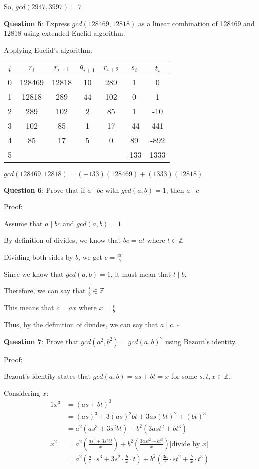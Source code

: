 \documentclass{article} %
\newcommand{\question}[2][]{\begin{flushleft}
        \textbf{Question #1}: #2

\end{flushleft}}
\begin{document}
    So, $gcd(2947, 3997) = 7$

    \question[5]{Express $gcd(128469, 12818)$ as a linear combination of 128469 and 12818 using 
    extended Euclid algorithm.}

    Applying Euclid's algorithm:
    \begin{tabular}{|c|c|c|c|c|c|c|}
        \hline
        $i$ & $r_i$ & $r_{i + 1}$ & $q_{i + 1}$ & $r_{i + 2}$ & $s_i$ & $t_i$\\\hline
        0 & 128469 & 12818 & 10 & 289 & 1    & 0    \\
        1 & 12818  & 289   & 44 & 102 & 0    & 1    \\
        2 & 289    & 102   & 2  &  85 & 1    & -10  \\
        3 & 102    & 85    & 1  &  17 & -44  & 441  \\
        4 & 85     & 17    & 5  &   0 & 89   & -892 \\
        5 &        &       &    &     & -133 & 1333 \\\hline 
    \end{tabular}
    \vspace*{0.1cm}

    $gcd(128469, 12818) = (-133)(128469) + (1333)(12818)$

    \question[6]{Prove that if $a \mid bc$ with $gcd(a, b) = 1$, then $a \mid c$}

    Proof:

    Assume that $a \mid bc$ and $gcd(a, b) = 1$

    By definition of divides, we know that $bc = at$ where $t \in \mathbb{Z}$

    Dividing both sides by $b$, we get $c = \frac{at}{b}$

    Since we know that $gcd(a, b) = 1$, it must mean that $t \mid b$.

    Therefore, we can say that $\frac{t}{b} \in \mathbb{Z}$

    This means that $c = ax$ where $x = \frac{t}{b}$ 

    Thus, by the definition of divides, we can say that $a \mid c$. $\square$

    \question[7]{Prove that $gcd(a^2,b^2)=gcd(a,b)^2$ using Bezout's identity.}

    Proof:

    Bezout's identity states that $gcd(a, b) = as + bt = x$ for some $s, t, x \in \mathbb{Z}$.

    Considering $x$:
    \begin{alignat*}{1}
        x^3 &= (as + bt)^3\\
        &= \left(as\right)^3+3\left(as\right)^2bt+3as\left(bt\right)^2+\left(bt\right)^3\\
        &= a^2(as^3 + 3s^2bt) + b^2(3ast^2 + bt^3)\\
        x^2 &= a^2\left(\frac{as^3 + 3s^2bt}{x}\right) + b^2\left(\frac{3ast^2 + bt^3}{x}\right) \text{[divide by $x$]}\\
        &= a^2\left(\frac{a}{x} \cdot s^3+3s^2 \cdot \frac{b}{x}\cdot t\right)+b^2\left(\frac{3a}{x} \cdot st^2+\frac{b}{x}\cdot t^3\right)
    \end{alignat*}
\end{document}
